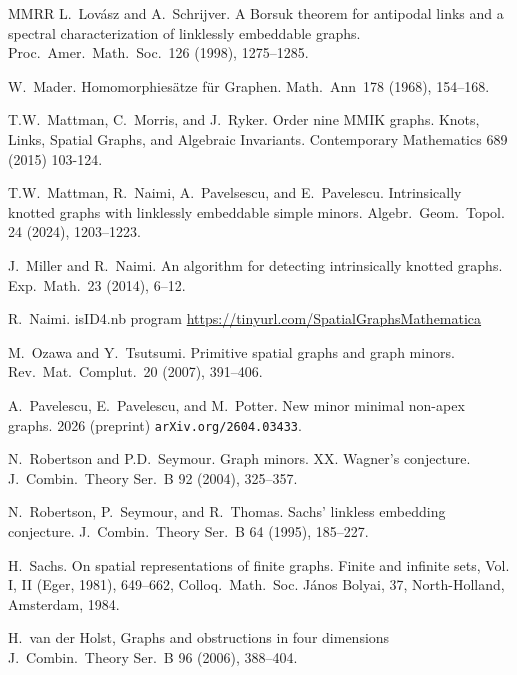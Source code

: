\documentclass{amsart}
\theoremstyle{remark}
\begin{document}
{\begin{thebibliography}{MMRR}
 L.~Lov\'asz and A.~Schrijver.
A Borsuk theorem for antipodal links and a spectral characterization of linklessly embeddable graphs.
Proc.~Amer.~Math.~Soc.~126 (1998), 1275–1285.

 W.~Mader.
 Homomorphies\"atze f\"ur Graphen.
 Math.~Ann~178  (1968), 154--168.


 T.W.~Mattman, C.~Morris, and J.~Ryker. Order nine MMIK graphs. Knots, Links, Spatial Graphs, and Algebraic Invariants. 
Contemporary Mathematics 689 (2015) 103-124.

  T.W.~Mattman, R.~Naimi, A.~Pavelsescu, and E.~Pavelescu. 
Intrinsically knotted graphs with linklessly embeddable simple minors.
Algebr.~Geom.~Topol. 24 (2024), 1203–1223.

 J.~Miller and R.~Naimi. An algorithm for detecting intrinsically knotted graphs.
 Exp.~Math.~23  (2014),  6--12.
 
  R.~Naimi. isID4.nb program
 \url{
https://tinyurl.com/SpatialGraphsMathematica
 }
 
  M.~Ozawa and Y.~Tsutsumi.
Primitive spatial graphs and graph minors.
Rev.~Mat.~Complut.~20 (2007), 391–406.

 A.~Pavelescu, E.~Pavelescu, and M.~Potter.
New minor minimal non-apex graphs. 2026
(preprint)  \texttt{arXiv.org/2604.03433}.
 
  N.~Robertson and P.D.~Seymour.
Graph minors. XX. Wagner's conjecture.
J.~Combin.~Theory Ser.~B 92 (2004), 325–357.

N.~Robertson, P.~Seymour, and R.~Thomas.
Sachs' linkless embedding conjecture.
J.~Combin.~Theory Ser.~B 64 (1995), 185–227.
 
 H.~Sachs.  On spatial representations of finite graphs.
 Finite and infinite sets, Vol. I, II (Eger, 1981), 
 649--662, Colloq.~Math.~Soc. J\'{a}nos Bolyai, 37, North-Holland, Amsterdam,  1984.
 

 H.~van der Holst, 
Graphs and obstructions in four dimensions
J.~Combin.~Theory Ser.~B 96 (2006), 388–404.


\end{thebibliography}}
\end{document}

